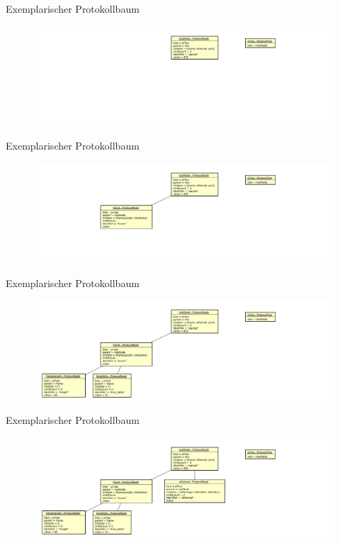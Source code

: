 \begin{frame}{Exemplarischer Protokollbaum}
    \begin{figure}
    	\centering
    	\includegraphics[width=\textwidth]{./images/prototree/baum0.pdf}
    \end{figure}
\end{frame}

\begin{frame}{Exemplarischer Protokollbaum}
    \begin{figure}
    	\centering
    	\includegraphics[width=\textwidth]{./images/prototree/baum1.pdf}
    \end{figure}
\end{frame}

\begin{frame}{Exemplarischer Protokollbaum}
    \begin{figure}
    	\centering
    	\includegraphics[width=\textwidth]{./images/prototree/baum2.pdf}
    \end{figure}
\end{frame}

\begin{frame}{Exemplarischer Protokollbaum}
    \begin{figure}
    	\centering
    	\includegraphics[width=\textwidth]{./images/prototree/baum3.pdf}
    \end{figure}
\end{frame}

